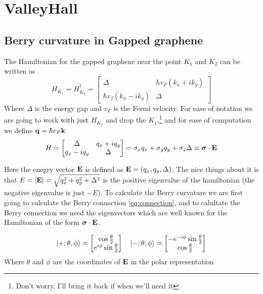 \chapter{ValleyHall}
\section{Berry curvature in Gapped graphene}

The Hamiltonian for the gapped graphene near the point $K_1$ and $K_2$ can be written as 
\begin{equation}
    H_{K_1}=H_{K_2}^\dagger=
    \begin{bmatrix}
        \Delta & \hbar v_F(k_x+ik_y)\\
        \hbar v_f(k_x-ik_y)& \Delta
    \end{bmatrix}
\end{equation}
Where $\Delta$ is the energy gap and $v_F$ is the Fermi velocity. For ease of notation we are going to work with just $H_{K_1}$ and drop the $K_1$,\footnote{Don't worry, I'll bring it back if when we'll need it} and for ease of computation we define $\mathbf{q}=\hbar v_F\mathbf{k}$
\begin{equation}
    H=
    \begin{bmatrix}
        \Delta & q_x+iq_y\\
        q_x-iq_y& \Delta
    \end{bmatrix}=
    \sigma_x q_x + \sigma_y q_y + \sigma_z \Delta \equiv  \boldsymbol \sigma \cdot \mathbf{E}
\end{equation}

Here the enegry vector $\mathbf{E}$ is defined as $\mathbf{E} =( q_x,q_y,\Delta)$. The nice things about it is that $E=|\mathbf{E}|=\sqrt{q_x^2+q_y^2+\Delta^2}$ is the positive eigenvalue of the hamiltonian (the negative eigenvalue is just $-E$).\newline
To calculate the Berry curvature we are first going to calculate the Berry connection \ref{eq:connection}, and to calultate the Berry connection we need the eigenvectors which are well known for the Hamiltonian of the form $\boldsymbol \sigma \cdot \mathbf{E}$.

\begin{equation}
    \ket{+;\theta,\phi}=
    \begin{bmatrix}
        \cos{\frac \theta 2}\\
        e^{i\phi}\sin{\frac \theta 2}
    \end{bmatrix}
    \quad
    \ket{-;\theta,\phi}=
    \begin{bmatrix}
        -e^{-i\phi}\sin{\frac \theta 2}\\
        \cos{\frac \theta 2}
    \end{bmatrix}
\end{equation}
Where $\theta$ and $\phi$ are the coordinates of $\mathbf{E}$ in the polar representation

